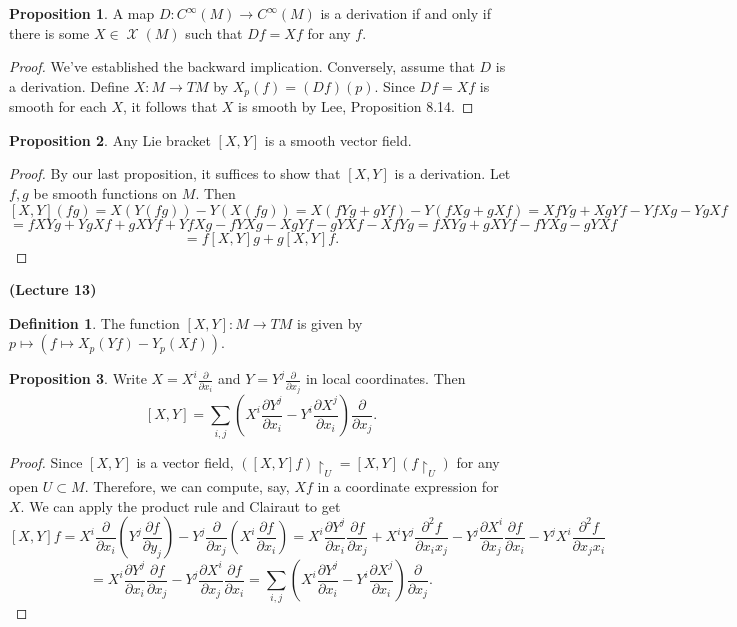 \documentclass[10pt,letterpaper,cm]{nupset}
\theoremstyle{definition}
\newtheorem*{definition}{Definition}
\newtheorem{prop}{Proposition}
\newcommand{\1}{\mathbf{1}}
\newcommand{\0}{\vec 0}
\DeclareMathOperator{\vf}{\mathscr{X}}
\begin{document}
\begin{prop}
A map $D: C^{\infty}(M) \to C^{\infty}(M)$ is a derivation if and only if there is some $X \in \vf(M)$ such that $Df = Xf$ for any $f$.
\end{prop}
\begin{proof}
We've established the backward implication. Conversely, assume that $D$ is a derivation. Define $X : M \to TM$ by $X_p(f) = (Df)(p)$. Since $Df = Xf$ is smooth for each $X$, it follows that $X$ is smooth by Lee, Proposition 8.14.
\end{proof}

\begin{prop}
Any Lie bracket $[X, Y]$ is a smooth vector field.
\end{prop}
\begin{proof}
By our last proposition, it suffices to show that $[X, Y]$ is a derivation. Let $f, g$ be smooth functions on $M$. Then
$$  [X, Y](fg) = X(Y(fg)) - Y(X(fg)) =  X(fYg + gYf) - Y(fXg + gXf) = XfYg + XgYf - YfXg - YgXf$$ $$= fXYg + YgXf + gXYf + YfXg - fYXg - XgYf - gYXf - XfYg = fXYg + gXYf - fYXg - gYXf$$ $$= f[X,Y]g + g[X,Y]f
.$$
\end{proof}

\begin{center}
{\textbf{(Lecture 13)}} 
\end{center}

\begin{definition}
The function $[X, Y] : M \to TM$ is given by $p\mapsto (f \mapsto X_p(Yf) - Y_p(Xf))$.
\end{definition}

\begin{prop}
Write $X = X^i\frac{\partial}{\partial{x_i}}$ and $Y = Y^j \frac{\partial}{\partial{x_j}}$ in local coordinates. Then $$[X, Y] = \sum_{i, j}(X^i \frac{\partial{Y^j}}{\partial{x_i}} - Y^i\frac{\partial{X^j}}{\partial{x_i}})\frac{\partial}{\partial{x_j}}.$$
\end{prop}
\begin{proof}
Since $[X, Y]$ is a vector field, $([X, Y]f) \restriction_U = [X, Y](f\restriction_U)$ for any open $U \subset M$. Therefore, we can compute, say, $Xf$ in a coordinate expression for $X$.  We can apply the product rule and Clairaut to get
$$[X, Y]f = X^i \frac{\partial}{\partial{x_i}} (Y^j \frac{\partial{f}}{\partial{y_j}}) - Y^j \frac{\partial}{\partial{x_j}} (X^i \frac{\partial{f}}{\partial{x_i}}) =  X^i \frac{\partial{Y^j}}{\partial{x_i}}\frac{\partial{f}}{\partial{x_j}} + X^i Y^j \frac{\partial^2{f}}{\partial{x_i}{x_j}} - Y^j \frac{\partial{X^i}}{\partial{x_j}}\frac{\partial{f}}{\partial{x_i}} - Y^j X^i \frac{\partial^2{f}}{\partial{x_j}{x_i}}$$ $$= X^i \frac{\partial{Y^j}}{\partial{x_i}}\frac{\partial{f}}{\partial{x_j}} -  Y^j \frac{\partial{X^i}}{\partial{x_j}}\frac{\partial{f}}{\partial{x_i}} = \sum_{i, j}(X^i \frac{\partial{Y^j}}{\partial{x_i}} - Y^i\frac{\partial{X^j}}{\partial{x_i}})\frac{\partial}{\partial{x_j}}.$$
\end{proof}
\end{document}
